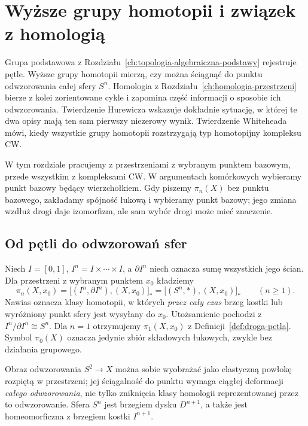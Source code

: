\chapter{Wyższe grupy homotopii i związek z homologią}
\label{ch:wyzsza-homotopia}

Grupa podstawowa z Rozdziału~\ref{ch:topologia-algebraiczna-podstawy}
rejestruje pętle. Wyższe grupy homotopii mierzą, czy można
ściągnąć do punktu odwzorowania całej sfery $S^n$. Homologia z
Rozdziału~\ref{ch:homologia-przestrzeni} bierze z kolei
zorientowane cykle i zapomina część informacji o sposobie ich
odwzorowania. Twierdzenie Hurewicza wskazuje dokładnie sytuację,
w której te dwa opisy mają ten sam pierwszy niezerowy wynik.
Twierdzenie Whiteheada mówi, kiedy wszystkie grupy homotopii
rozstrzygają typ homotopijny kompleksu CW.

W tym rozdziale pracujemy z przestrzeniami z wybranym punktem bazowym,
przede wszystkim z kompleksami CW. W argumentach komórkowych
wybieramy punkt bazowy będący wierzchołkiem. Gdy piszemy
$\pi_n(X)$ bez punktu bazowego, zakładamy spójność łukową i
wybieramy punkt bazowy; jego zmiana wzdłuż drogi daje izomorfizm, ale
sam wybór drogi może mieć znaczenie.

\section{Od pętli do odwzorowań sfer}
\label{sec:grupy-pi-n}

\begin{definicja}
\label{def:pi-n}
Niech $I=[0,1]$, $I^n=I\times\cdots\times I$, a
$\partial I^n$ niech oznacza sumę wszystkich jego ścian.
Dla przestrzeni z wybranym punktem $x_0$ kładziemy
\[
 \pi_n(X,x_0)
 =\big[(I^n,\partial I^n),(X,x_0)\big]_*
 =\big[(S^n,*),(X,x_0)\big]_*
 \qquad(n\geq1).
\]
Nawias oznacza klasy homotopii, w których
\emph{przez cały czas} brzeg kostki lub wyróżniony
punkt sfery jest wysyłany do $x_0$.
Utożsamienie pochodzi z $I^n/\partial I^n\cong S^n$.
Dla $n=1$ otrzymujemy $\pi_1(X,x_0)$ z
Definicji~\ref{def:droga-petla}. Symbol $\pi_0(X)$
oznacza jedynie zbiór składowych łukowych,
zwykle bez działania grupowego.
\end{definicja}

Obraz odwzorowania $S^2\to X$ można sobie wyobrażać jako
elastyczną powłokę rozpiętą w przestrzeni; jej
ściągalność do punktu wymaga ciągłej deformacji
\emph{całego odwzorowania}, nie tylko zniknięcia klasy
homologii reprezentowanej przez to odwzorowanie. Sfera $S^n$ jest brzegiem dysku $D^{n+1}$,
a także jest homeomorficzna z brzegiem kostki $I^{n+1}$.

